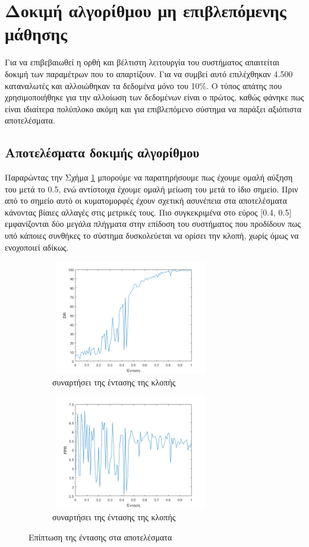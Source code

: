 \section{Δοκιμή αλγορίθμου μη επιβλεπόμενης μάθησης}
Για να επιβεβαιωθεί η ορθή και βέλτιστη λειτουργία του συστήματος απαιτείται δοκιμή των παραμέτρων που το απαρτίζουν. Για να συμβεί αυτό επιλέχθηκαν 4.500 καταναλωτές και αλλοιώθηκαν τα δεδομένα μόνο του 10\%. Ο τύπος απάτης που χρησιμοποιήθηκε για την αλλοίωση των δεδομένων είναι ο πρώτος, καθώς φάνηκε πως είναι ιδιαίτερα πολύπλοκο ακόμη και για επιβλεπόμενο σύστημα να παράξει αξιόπιστα αποτελέσματα.

\subsection{Αποτελέσματα δοκιμής αλγορίθμου}
Παραρώντας την Σχήμα \ref{fig:unsupDRintensity} μπορούμε να παρατηρήσουμε πως έχουμε ομαλή αύξηση του  μετά το 0.5, ενώ αντίστοιχα έχουμε ομαλή μείωση του  μετά το ίδιο σημείο. Πριν από το σημείο αυτό οι κυματομορφές έχουν σχετική ασυνέπεια στα αποτελέσματα κάνοντας βίαιες αλλαγές στις μετρικές τους. Πιο συγκεκριμένα στο εύρος [0.4, 0.5] εμφανίζονται δύο μεγάλα πλήγματα στην επίδοση του συστήματος που προδίδουν πως υπό κάποιες συνθήκες το σύστημα δυσκολεύεται να ορίσει την κλοπή, χωρίς όμως να ενοχοποιεί αδίκως.\par

\begin{figure}
\centering
\begin{subfigure}[b]{0.4\textwidth}
 \includegraphics[width=70mm, height=50mm]{../../plots/gr_bigres_dr_intensity_un_sup.png}
\caption{ συναρτήσει της έντασης της κλοπής}
\label{fig:unsupDRintensity}
\end{subfigure}
\quad
\begin{subfigure}[b]{0.4\textwidth}
\includegraphics[width=70mm, height=50mm]{../../plots/gr_bigres_fpr_intensity_un_sup.png}
\caption{ συναρτήσει της έντασης της κλοπής}
\label{fig:linearFPRintensity}
\end{subfigure}
\caption{Επίπτωση της έντασης στα αποτελέσματα}
\label{fig:unsupintensityres}
\end{figure}

